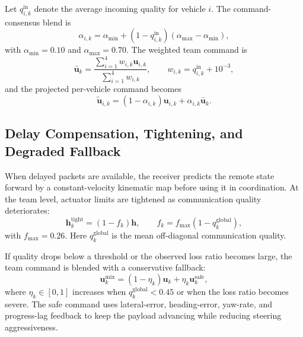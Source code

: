 \documentclass[twocolumn,3p,times,procedia]{elsarticle}
\begin{document}
Let $q^{\text{in}}_{i,k}$ denote the average incoming quality for vehicle $i$. The command-consensus blend is
\begin{equation}
\alpha_{i,k}=\alpha_{\min}+\left(1-q^{\text{in}}_{i,k}\right)\left(\alpha_{\max}-\alpha_{\min}\right),
\label{eq:blend}
\end{equation}
with $\alpha_{\min}=0.10$ and $\alpha_{\max}=0.70$. The weighted team command is
\begin{equation}
\bar{\bm{u}}_k=\frac{\sum_{i=1}^{4} w_{i,k}\bm{u}_{i,k}}{\sum_{i=1}^{4}w_{i,k}},
\qquad
w_{i,k}=q^{\text{in}}_{i,k}+10^{-3},
\end{equation}
and the projected per-vehicle command becomes
\begin{equation}
\tilde{\bm{u}}_{i,k}=(1-\alpha_{i,k})\bm{u}_{i,k}+\alpha_{i,k}\bar{\bm{u}}_{k}.
\label{eq:consensus_projection}
\end{equation}

\subsection{Delay Compensation, Tightening, and Degraded Fallback}
When delayed packets are available, the receiver predicts the remote state forward by a constant-velocity kinematic map before using it in coordination. At the team level, actuator limits are tightened as communication quality deteriorates:
\begin{equation}
\bm{h}_{k}^{\text{tight}}=(1-f_k)\bm{h},\qquad
f_k=f_{\max}(1-q^{\text{global}}_k),
\end{equation}
with $f_{\max}=0.26$. Here $q^{\text{global}}_k$ is the mean off-diagonal communication quality.

If quality drops below a threshold or the observed loss ratio becomes large, the team command is blended with a conservative fallback:
\begin{equation}
\bm{u}^{\text{mix}}_k=(1-\eta_k)\bm{u}_k+\eta_k\bm{u}^{\text{safe}}_k,
\label{eq:fallback}
\end{equation}
where $\eta_k\in[0,1]$ increases when $q^{\text{global}}_k<0.45$ or when the loss ratio becomes severe. The safe command uses lateral-error, heading-error, yaw-rate, and progress-lag feedback to keep the payload advancing while reducing steering aggressiveness.
\end{document}
